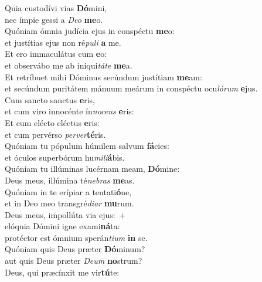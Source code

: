 \evenverse Quia custodívi vias \textbf{Dó}mini,~\*\\
\evenverse nec ímpie gessi a \textit{De}\textit{o} \textbf{me}o.\\
\oddverse Quóniam ómnia judícia ejus in conspéctu \textbf{me}o:~\*\\
\oddverse et justítias ejus non ré\textit{pu}\textit{li} \textbf{a} me.\\
\evenverse Et ero immaculátus cum \textbf{e}o:~\*\\
\evenverse et observábo me ab iniqui\textit{tá}\textit{te} \textbf{me}a.\\
\oddverse Et retríbuet mihi Dóminus secúndum justítiam \textbf{me}am:~\*\\
\oddverse et secúndum puritátem mánuum meárum in conspéctu ocu\textit{ló}\textit{rum} \textbf{e}jus.\\
\evenverse Cum sancto sanctus \textbf{e}ris,~\*\\
\evenverse et cum viro innocénte ín\textit{no}\textit{cens} \textbf{e}ris:\\
\oddverse Et cum elécto eléctus \textbf{e}ris:~\*\\
\oddverse et cum pervérso \textit{per}\textit{ver}\textbf{té}ris.\\
\evenverse Quóniam tu pópulum húmilem salvum \textbf{fá}cies:~\*\\
\evenverse et óculos superbórum hu\textit{mi}\textit{li}\textbf{á}bis.\\
\oddverse Quóniam tu illúminas lucérnam meam, \textbf{Dó}mine:~\*\\
\oddverse Deus meus, illúmina té\textit{ne}\textit{bras} \textbf{me}as.\\
\evenverse Quóniam in te erípiar a tentati\textbf{ó}ne,~\*\\
\evenverse et in Deo meo transgré\textit{di}\textit{ar} \textbf{mu}rum.\\
\oddverse Deus meus, impollúta via ejus:~+\\
\oddverse  elóquia Dómini igne exami\textbf{ná}ta:~\*\\
\oddverse protéctor est ómnium sperán\textit{ti}\textit{um} \textbf{in} se.\\
\evenverse Quóniam quis Deus præter \textbf{Dó}minum?~\*\\
\evenverse aut quis Deus præter \textit{De}\textit{um} \textbf{no}strum?\\
\oddverse Deus, qui præcínxit me vir\textbf{tú}te:~\*\\
